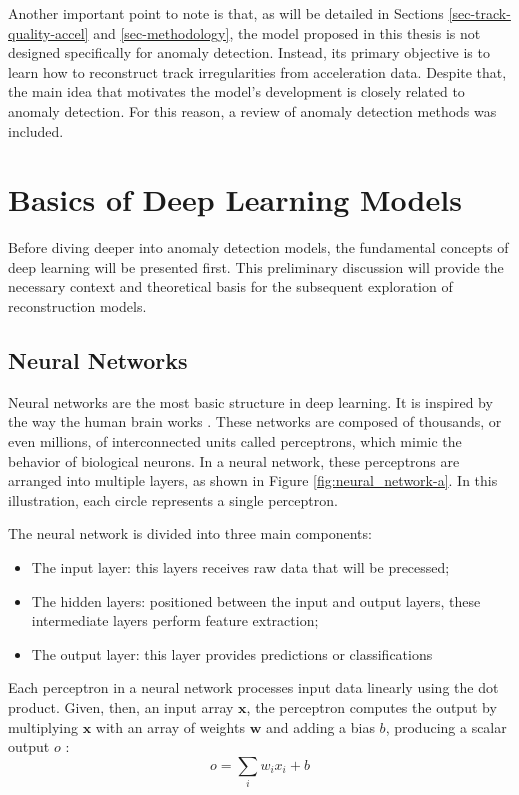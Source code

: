 Another important point to note is that, as will be detailed in Sections \ref{sec-track-quality-accel} and \ref{sec-methodology}, the model proposed in this thesis is not designed specifically for anomaly detection. Instead, its primary objective is to learn how to reconstruct track irregularities from acceleration data. Despite that, the main idea that motivates the model's development is closely related to anomaly detection. For this reason, a review of anomaly detection methods was included.

\section{Basics of Deep Learning Models}

Before diving deeper into anomaly detection models, the fundamental concepts of deep learning will be presented first. This preliminary discussion will provide the necessary context and theoretical basis for the subsequent exploration of reconstruction models.

\subsection{Neural Networks} \label{sec-Neural_networks}

Neural networks are the most basic structure in deep learning. It is inspired by the way the human brain works \cite{AGATONOVICKUSTRIN2000717}. These networks are composed of thousands, or even millions, of interconnected units called perceptrons, which mimic the behavior of biological neurons. In a neural network, these perceptrons are arranged into multiple layers, as shown in Figure \ref{fig:neural_network-a}. In this illustration, each circle represents a single perceptron. 

The neural network is divided into three main components: 
\begin{itemize}
    \item The input layer: this layers receives raw data that will be precessed;
    \item The hidden layers: positioned between the input and output layers, these intermediate layers perform feature extraction;
    \item The output layer: this layer provides predictions or classifications
\end{itemize}

Each perceptron in a neural network processes input data linearly using the dot product. Given, then, an input array $\mathbf{x}$, the perceptron computes the output by multiplying $\mathbf{x}$ with an array of weights $\mathbf{w}$ and adding a bias $b$, producing a scalar output $o$ \cite{Gurney_1997}:
\begin{equation}
    o = \sum_{i}w_i x_i + b
\end{equation}

